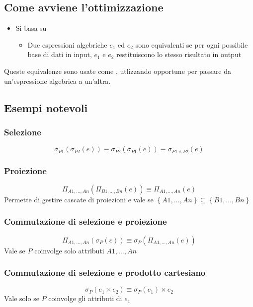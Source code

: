 \documentclass[12pt, a4paper]{report}
\begin{document}
    \subsection{Come avviene l'ottimizzazione}
    \begin{itemize}
        \item Si basa su  \begin{itemize}
            \item Due espressioni algebriche $e_{1} \text{ ed } e_{2}$ sono equivalenti se per ogni possibile base di dati in input, $e_{1}$ e $e_{2}$ restituiscono lo stesso risultato in output
        \end{itemize}
    \end{itemize}
    Queste equivalenze sono usate come , utlizzando opportune  per passare da un'espressione algebrica a un'altra.
    \subsection{Esempi notevoli}
    \subsubsection{Selezione}
    \begin{equation*}
        \sigma_{P1}(\sigma_{P2}(e))\equiv \sigma_{P2}(\sigma_{P1}(e)) \equiv \sigma_{P1 \land P2}(e)
    \end{equation*}
    \subsubsection{Proiezione}
    \begin{equation*}
        \Pi_{A1,\ldots,An}(\Pi_{B1,\ldots,Bn}(e))\equiv \Pi_{A1,\ldots,An}(e)
    \end{equation*}
    Permette di gestire cascate di proiezioni e vale se $\left\{A1,\ldots,An\right\}\subseteq \left\{B1,\ldots,Bn\right\}$
    \subsubsection{Commutazione di selezione e proiezione}
    \begin{equation*}
        \Pi_{A1,\ldots,An}(\sigma_{P}(e))\equiv \sigma_{P}(\Pi_{A1,\ldots,An}(e))
    \end{equation*}
    Vale se $P$ coinvolge solo attributi $A1,\ldots,An$
    \subsubsection{Commutazione di selezione e prodotto cartesiano}
    \begin{equation*}
        \sigma_{P}(e_{1}\times e_{2}) \equiv \sigma_{P}(e_{1})\times e_{2}
    \end{equation*}
    Vale solo se $P$ coinvolge gli attributi di $e_{1}$
\end{document}
